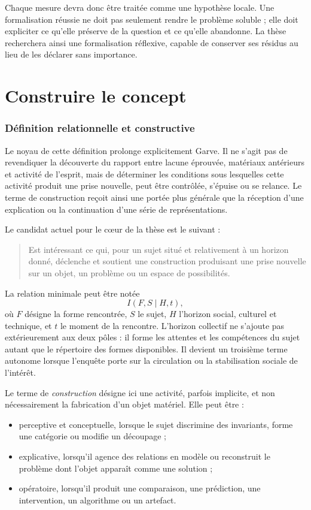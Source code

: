 \documentclass[11pt,a4paper]{article}
\begin{document}
Chaque mesure devra donc être traitée comme une hypothèse locale. Une
formalisation réussie ne doit pas seulement rendre le problème soluble ; elle
doit expliciter ce qu'elle préserve de la question et ce qu'elle abandonne. La
thèse recherchera ainsi une formalisation réflexive, capable de conserver ses
résidus au lieu de les déclarer sans importance.

\part{Construire le concept}

\section{Définition relationnelle et constructive}

Le noyau de cette définition prolonge explicitement Garve. Il ne s'agit pas de
revendiquer la découverte du rapport entre lacune éprouvée, matériaux antérieurs
et activité de l'esprit, mais de déterminer les conditions sous lesquelles
cette activité produit une prise nouvelle, peut être contrôlée, s'épuise ou se
relance. Le terme de construction reçoit ainsi une portée plus générale que la
réception d'une explication ou la continuation d'une série de représentations.

Le candidat actuel pour le cœur de la thèse est le suivant :

\begin{quote}
Est intéressant ce qui, pour un sujet situé et relativement à un horizon donné,
déclenche et soutient une construction produisant une prise nouvelle sur un
objet, un problème ou un espace de possibilités.
\end{quote}

La relation minimale peut être notée
\[
  I(F,S\mid H,t),
\]
où \(F\) désigne la forme rencontrée, \(S\) le sujet, \(H\) l'horizon social,
culturel et technique, et \(t\) le moment de la rencontre. L'horizon collectif
ne s'ajoute pas extérieurement aux deux pôles : il forme les attentes et les
compétences du sujet autant que le répertoire des formes disponibles. Il devient
un troisième terme autonome lorsque l'enquête porte sur la circulation ou la
stabilisation sociale de l'intérêt.

Le terme de \emph{construction} désigne ici une activité, parfois implicite, et
non nécessairement la fabrication d'un objet matériel. Elle peut être :

\begin{itemize}
  \item perceptive et conceptuelle, lorsque le sujet discrimine des invariants,
        forme une catégorie ou modifie un découpage ;
  \item explicative, lorsqu'il agence des relations en modèle ou reconstruit le
        problème dont l'objet apparaît comme une solution ;
  \item opératoire, lorsqu'il produit une comparaison, une prédiction, une
        intervention, un algorithme ou un artefact.
\end{itemize}
\end{document}
